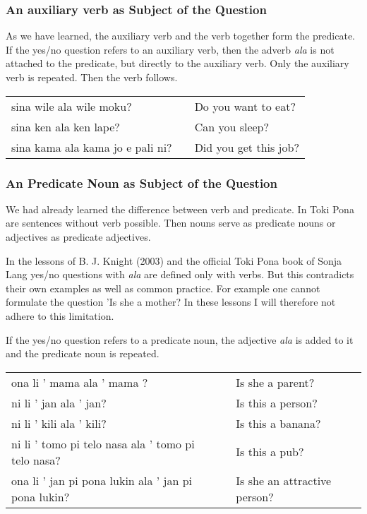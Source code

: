 \subsubsection*{An auxiliary verb as Subject of the Question}
%
As we have learned, the auxiliary verb and the verb together form the predicate.
If the yes/no question refers to an auxiliary verb, then the adverb \textit{ala} is not attached to the predicate, but directly to the auxiliary verb.
Only the auxiliary verb is repeated.
Then the verb follows.

\begin{supertabular}{p{5,5cm}|ll}
    sina wile ala wile moku?         &  & Do you want to eat?   \\
    sina ken ala ken lape?           &  & Can you sleep?        \\
    sina kama ala kama jo e pali ni? &  & Did you get this job? \\
\end{supertabular}

\subsubsection*{An Predicate Noun as Subject of the Question}
%
We had already learned the difference between verb and predicate.
In Toki Pona are sentences without verb possible.
Then nouns serve as predicate nouns or adjectives as predicate adjectives.

In the lessons of B. J. Knight (2003) and the official Toki Pona book of Sonja Lang \cite{www:tokipona.org} yes/no questions with \textit{ala} are defined only with verbs.
But this contradicts their own examples as well as common practice.
For example one cannot formulate the question 'Is she a mother?
In these lessons I will therefore not adhere to this limitation.

If the yes/no question refers to a predicate noun, the adjective \textit{ala} is added to it and the predicate noun is repeated.

\begin{supertabular}{p{5,5cm}|ll}
    ona li ' mama ala ' mama ?                          &  & Is she a parent?             \\
    ni li ' jan ala ' jan?                              &  & Is this a person?            \\
    ni li ' kili ala ' kili?                            &  & Is this a banana?            \\
    ni li ' tomo pi telo nasa ala ' tomo pi telo nasa?  &  & Is this a pub?               \\
    ona li ' jan pi pona lukin ala ' jan pi pona lukin? &  & Is she an attractive person? \\
\end{supertabular}

